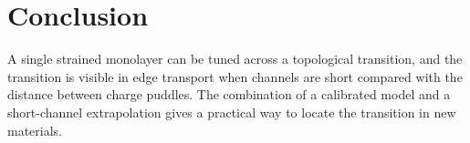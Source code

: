 \chapter{Conclusion}
\label{ch:conclusion}

A single strained monolayer can be tuned across a topological transition, and the transition is
visible in edge transport when channels are short compared with the distance between charge
puddles. The combination of a calibrated model and a short-channel extrapolation gives a
practical way to locate the transition in new materials.
